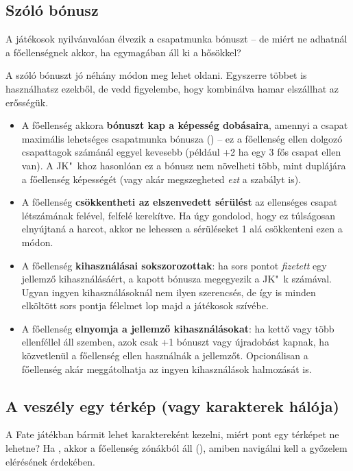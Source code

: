 \subsection{Szóló bónusz}

A játékosok nyilvánvalóan élvezik a csapatmunka bónuszt -- de miért ne adhatnál a főellenségnek  akkor, ha egymagában áll ki a hősökkel?

A szóló bónuszt jó néhány módon meg lehet oldani. Egyszerre többet is használhatsz ezekből, de vedd figyelembe, hogy kombinálva hamar elszállhat az erősségük.

\begin{itemize}
    \item A főellenség akkora \textbf{bónuszt kap a képesség dobásaira}, amennyi a csapat maximális lehetséges csapatmunka bónusza () -- ez a főellenség ellen dolgozó csapattagok számánál eggyel kevesebb (például +2 ha egy 3 fős csapat ellen van). A JK"~khoz hasonlóan ez a bónusz nem növelheti több, mint duplájára a főellenség képességét (vagy akár megszegheted \emph{ezt} a szabályt is).
    \item A főellenség \textbf{csökkentheti az elszenvedett sérülést} az ellenséges csapat létszámának felével, felfelé kerekítve. Ha úgy gondolod, hogy ez túlságosan elnyújtaná a harcot, akkor ne lehessen a sérüléseket 1 alá csökkenteni ezen a módon.
    \item A főellenség \textbf{kihasználásai sokszorozottak}: ha sors pontot \emph{fizetett} egy jellemző kihasználásáért, a kapott bónusza megegyezik a JK"~k számával. Ugyan ingyen kihasználásoknál nem ilyen szerencsés, de így is minden elköltött sors pontja félelmet lop majd a játékosok szívébe.
    \item A főellenség \textbf{elnyomja a jellemző kihasználásokat}: ha kettő vagy több ellenféllel áll szemben, azok csak +1 bónuszt vagy újradobást kapnak, ha közvetlenül a főellenség ellen használnák a jellemzőt. Opcionálisan a főellenség akár meggátolhatja az ingyen kihasználások halmozását is.
\end{itemize}

\newpage

\subsection{A veszély egy térkép (vagy karakterek hálója)}

A Fate játékban bármit lehet karaktereként kezelni, miért pont egy térképet ne lehetne? Ha , akkor a főellenség zónákból áll (), amiben navigálni kell a győzelem elérésének érdekében.

